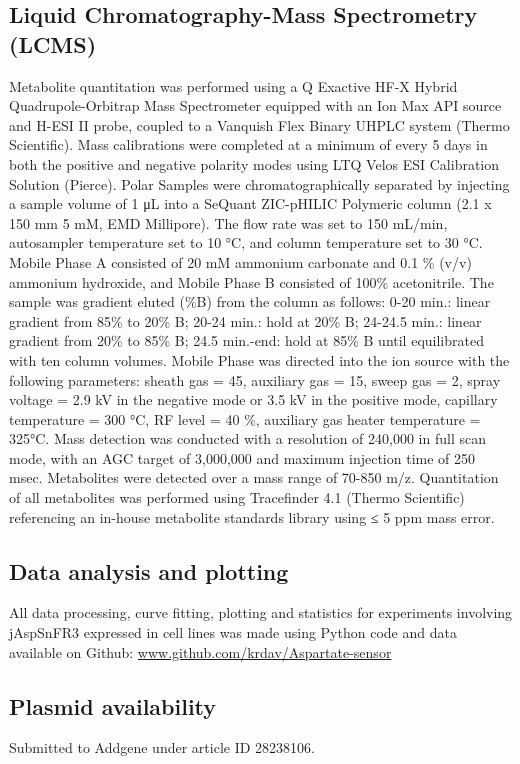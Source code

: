 \documentclass[9pt,lineno]{elife}
\begin{document}
\subsection{Liquid Chromatography-Mass Spectrometry (LCMS)}
Metabolite quantitation was performed using a Q Exactive HF-X Hybrid Quadrupole-Orbitrap Mass Spectrometer equipped with an Ion Max API source and H-ESI II probe, coupled to a Vanquish Flex Binary UHPLC system (Thermo Scientific).
Mass calibrations were completed at a minimum of every 5 days in both the positive and negative polarity modes using LTQ Velos ESI Calibration Solution (Pierce).
Polar Samples were chromatographically separated by injecting a sample volume of 1 μL into a SeQuant ZIC-pHILIC Polymeric column (2.1 x 150 mm 5 mM, EMD Millipore).
The flow rate was set to 150 mL/min, autosampler temperature set to 10 °C, and column temperature set to 30 °C.
Mobile Phase A consisted of 20 mM ammonium carbonate and 0.1 \% (v/v) ammonium hydroxide, and Mobile Phase B consisted of 100\% acetonitrile.
The sample was gradient eluted (\%B) from the column as follows: 0-20 min.: linear gradient from 85\% to 20\% B; 20-24 min.: hold at 20\% B; 24-24.5 min.: linear gradient from 20\% to 85\% B; 24.5 min.-end: hold at 85\% B until equilibrated with ten column volumes.
Mobile Phase was directed into the ion source with the following parameters: sheath gas = 45, auxiliary gas = 15, sweep gas = 2, spray voltage = 2.9 kV in the negative mode or 3.5 kV in the positive mode, capillary temperature = 300 °C, RF level = 40 \%, auxiliary gas heater temperature = 325°C.
Mass detection was conducted with a resolution of 240,000 in full scan mode, with an AGC target of 3,000,000 and maximum injection time of 250 msec.
Metabolites were detected over a mass range of 70-850 m/z.
Quantitation of all metabolites was performed using Tracefinder 4.1 (Thermo Scientific) referencing an in-house metabolite standards library using ≤ 5 ppm mass error.

\subsection{Data analysis and plotting}
All data processing, curve fitting, plotting and statistics for experiments involving jAspSnFR3 expressed in cell lines was made using Python code and data available on Github:
\url{www.github.com/krdav/Aspartate-sensor}

\subsection{Plasmid availability}
Submitted to Addgene under article ID 28238106.
\end{document}
